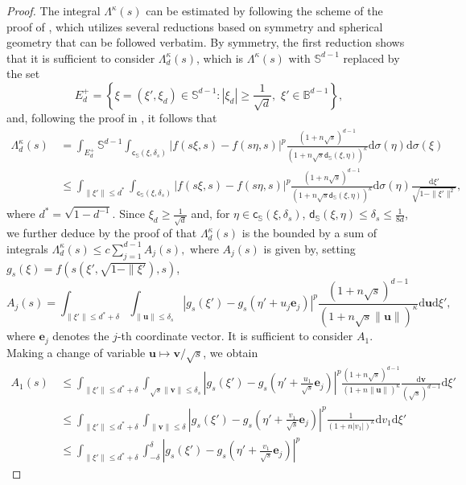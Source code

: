 \documentclass{amsart}
\theoremstyle{remark}
\def\d{\mathrm{d}}
\def\sph{{\mathbb{S}^{d-1}}}
\def\k{{\kappa}}
\def\s{\sigma}
\def\eb{{\mathbf e}}
\def\ub{{\mathbf u}}
\def\vb{{\mathbf v}}
\def\BB{{\mathbb B}}
\def\SS{{\mathbb S}}
\def\d{\mathrm{d}}
\def\sph{{\mathbb{S}^{d-1}}}
\def\sc{{\mathsf c}}
\def\sd{{\mathsf d}}
\def\k{{\kappa}}
\def\s{\sigma}
\def\ub{{\mathbf u}}
\def\vb{{\mathbf v}}
\def\BB{{\mathbb B}}
\def\SS{{\mathbb S}}
\begin{document}
\begin{proof}
The integral $\Lambda^\k(s)$ can be estimated by following the scheme of the proof of \cite[Lemma 4.3.1]{DaiX}, which 
utilizes several reductions based on symmetry and spherical geometry that can be followed verbatim. By symmetry,
the first reduction shows that it is sufficient to consider $\Lambda_d^\k(s)$, which is $\Lambda^\k(s)$ with $\sph$ replaced 
by the set
$$
E_d^+ = \left\{\xi = (\xi', \xi_d) \in \sph: |\xi_d| \ge \frac{1}{\sqrt{d}}, \,\, \xi' \in \BB^{d-1}\right\},
$$
and, following the proof in \cite[p. 90]{DaiX}, it follows that 
\begin{align*}
 \Lambda_d^\k(s)\,& =  \int_{E_d^+}  \sph \int_{\sc_\SS(\xi, \delta_s)} |f(s\xi,s) - f(s\eta,s)|^p \frac{(1+n \sqrt{s})^{d-1}}
         {(1+ n \sqrt{s} \sd_\SS(\xi,\eta))^\k}  \d \s(\eta)  \d \s(\xi) \\
   &\le \int_{\|\xi'\|\le d^*}  \int_{\sc_\SS(\xi, \delta_s)} |f(s\xi,s) - f(s\eta,s)|^p \frac{(1+n \sqrt{s})^{d-1}}
         {(1+ n \sqrt{s} \sd_\SS(\xi,\eta))^\k}  \d \s(\eta) \frac{\d \xi'}{\sqrt{1-\|\xi'\|^2}},
\end{align*}
where $d^* = \sqrt{1-d^{-1}}$. Since $\xi_d \ge \frac 1 {\sqrt{d}}$ and, for $\eta\in \sc_\SS(\xi,\delta_s)$, 
$\sd_\SS(\xi,\eta) \le \delta_s \le \frac{1}{8d}$, we further deduce by the proof of \cite[p. 90--91]{DaiX} that
$\Lambda_d^\k(s)$ is the bounded by a sum of integrals 
$
  \Lambda_d^\k(s) \le c \sum_{j=1}^{d-1} A_j(s),
$
where $A_j(s)$ is given by, setting $g_s(\xi) = f(s (\xi', \sqrt{1-\|\xi'}), s)$,   
$$
 A_j(s)=  \int_{\|\xi'\|\le d^*+\delta} \int_{\|\ub\|\le \delta_s} |g_s(\xi') - g_s(\eta' + u_j \eb_j)|^p \frac{(1+n \sqrt{s})^{d-1}}
         {(1+ n \sqrt{s} \|\ub\|)^\k}  \d \ub \d \xi', 
$$
where $\eb_j$ denotes the $j$-th coordinate vector. It is sufficient to consider $A_1$. Making a change of variable
$\ub \mapsto \vb /\sqrt{s}$, we obtain
\begin{align*}
 A_1(s) \,& \le \int_{\|\xi'\|\le d^*+\delta} \int_{\sqrt{s} \|\vb\|\le \delta_s} \left |g_s(\xi') - g_s\left(\eta' + \tfrac{u_1}{\sqrt{s}} \eb_j\right)\right|^p 
      \frac{(1+n\sqrt{s})^{d-1}} {(1+ n \|\ub\|)^\k}  \frac{\d \vb}{(\sqrt{s})^{d-1}} \d \xi' \\ 
 & \le \int_{\|\xi'\|\le d^*+\delta} \int_{\|\vb\| \le \delta} \left |g_s(\xi') - g_s\left(\eta' + \tfrac{v_1}{\sqrt{s}} \eb_j\right)\right|^p 
      \frac{1} {(1+ n |v_1|)^\k} \d v_1 \d \xi' \\
   & \le \int_{\|\xi'\|\le d^*+\delta} \int_{-\delta}^\delta \left |g_s(\xi') - g_s\left(\eta' + \tfrac{v_1}{\sqrt{s}} \eb_j\right)\right|^p 

\end{align*}
\end{proof}
\end{document}
